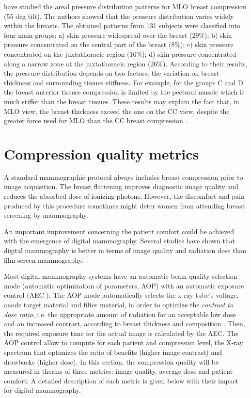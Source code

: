 \cite{dustler_breast_2012} have studied the areal pressure distribution patterns for MLO breast compression (55 deg tilt). The authors showed that the pressure distribution varies widely within the breasts. The obtained patterns from 131 subjects were classified into four main groups: a) skin pressure widespread over the breast (29\%); b) skin pressure concentrated on the central part of the breast (8\%); c) skin pressure concentrated on the juxtathoracic region (16\%); d) skin pressure concentrated along a narrow zone at the juxtathoracic region (26\%). According to their results, the pressure distribution depends on two factors: the variation on breast thickness and surrounding tissues stiffness. For example, for the groups C and D the breast  anterior tissues compression is limited by the pectoral muscle which is much stiffer than the breast tissues.  These results may explain the fact that, in MLO view, the breast thickness exceed the one on the CC view, despite the greater force used for MLO than the CC breast compression \citep{mercer_practitioner_2013, helvie_breast_1994}. 

\section{Compression quality metrics}
A standard mammographic protocol always includes breast compression prior to image acquisition. The breast flattening improves diagnostic image quality and reduces the absorbed dose of ionizing photons. However, the discomfort and pain produced by this procedure sometimes might deter women from attending breast screening by mammography. 

An important improvement concerning  the patient comfort could be achieved with the emergence of digital mammography.  Several studies have shown that digital mammography is better in terms of image quality \citep{obenauer_screen_2002} and radiation dose \citep{chen_analysis_2012} than film-screen mammography.

Most digital mammography systems have an automatic beam quality selection mode (automatic optimization of parameters, AOP) with an automatic exposure control (AEC ). The AOP mode automatically selects the  x-ray  tube’s  voltage,  anode  target  material  and  filter  material, in order to optimize the \textit{contrast to dose ratio}, i.e. the appropriate amount of radiation for an acceptable low dose and an increased contrast, according to breast thickness and composition \citep{williams_optimization_2008}. Then, the  required  exposure  time  for  the  actual  image  is  calculated  by  the  AEC.  The AOP control allow to compute for each patient and compression level,  the X-ray spectrum that optimizes  the  ratio of benefits  (higher image contrast) and  drawbacks  (higher  dose). 
In this section, the compression quality will be measured in therms of three metrics: image quality, average dose and patient comfort. A detailed description of each metric is given below with their impact for digital  mammography. 

